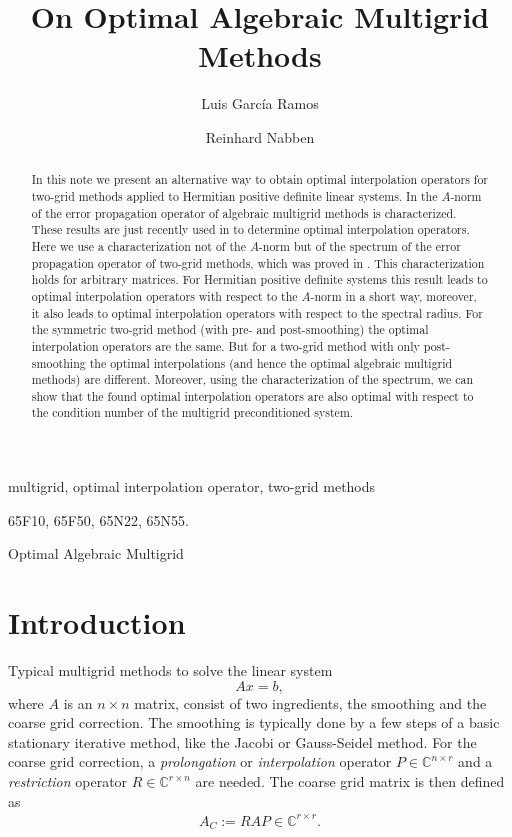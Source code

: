 \documentclass[final]{siamltex}
\author{
Luis Garc\'{i}a Ramos\footnotemark[1]
\and
Reinhard Nabben\footnotemark[1]
}
\title{On Optimal Algebraic Multigrid Methods}
\newcommand{\innCrr}{\in\mathbb{C}^{r\times r}}
\newcommand{\beq}{\begin{eqnarray}}
\newcommand{\eeq}{\end{eqnarray}}
\numberwithin{equation}{section}
\newcommand{\Crn}{\mathbb{C}^{r \times n}}
\newcommand{\Cnr}{\mathbb{C}^{n \times r}}
\begin{document}
\maketitle
\renewcommand{\thefootnote}{\fnsymbol{footnote}}

\renewcommand{\thefootnote}{\arabic{footnote}}
\begin{abstract}
In this note we present an alternative way to obtain optimal
interpolation operators for two-grid methods applied to Hermitian positive
definite linear systems.  In \cite{FalVZ05,Zik08} the $A$-norm of the error
propagation operator of algebraic multigrid methods is characterized. These
results are just recently used in \cite{XuZ17, Bra18} to determine optimal
interpolation operators. Here we use a characterization not of the $A$-norm but
of the spectrum of the  error propagation operator of two-grid methods, which
was proved in  \cite{GarKN18}. This characterization holds for arbitrary
matrices. For Hermitian positive definite systems this result   leads to
optimal interpolation operators with respect to the $A$-norm in a short way, 
moreover, it also leads to optimal interpolation operators with respect to the
spectral radius. For the symmetric two-grid method (with pre- and 
post-smoothing)
the optimal interpolation operators are the same. But for a two-grid method with only post-smoothing the optimal interpolations (and hence the
optimal algebraic multigrid
methods) are  different.  Moreover, using the  characterization of the
spectrum,
we can show that the found  optimal interpolation operators are also optimal
with
respect to the condition number of the multigrid preconditioned system.  
\end{abstract}


\begin{keywords}
multigrid, optimal interpolation operator, two-grid methods
\end{keywords}

\begin{AMS}
65F10, 65F50, 65N22, 65N55.
\end{AMS}

\pagestyle{myheadings}
\thispagestyle{plain}
 {Optimal Algebraic Multigrid}

\section{Introduction}
Typical multigrid methods to solve the linear system 
\[
Ax = b,
\]
where $A$ is an $n \times n$ matrix, consist  of two ingredients, the smoothing
and  the
coarse grid correction. The smoothing is typically done by a
few
steps of a basic stationary iterative method, like the Jacobi or Gauss-Seidel
method.  For the coarse grid correction,
 a {\it prolongation} or {\it interpolation}
operator $P \in \Cnr$ and a   {\it
restriction} operator $R \in \Crn$  are needed. The coarse grid matrix is then
defined as
\beq \label{def:multAC}
A_C :=  RAP \innCrr.
\eeq 
\end{document}
